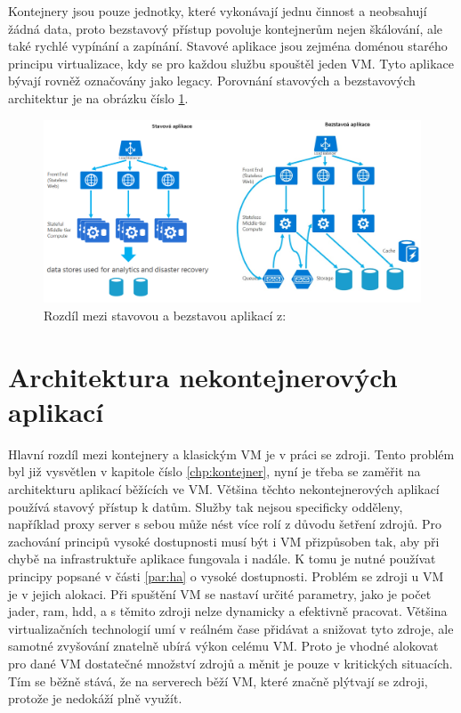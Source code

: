 Kontejnery jsou pouze jednotky, které vykonávají jednu činnost a neobsahují žádná data, proto bezstavový přístup povoluje kontejnerům nejen škálování, ale také rychlé vypínání a zapínání. Stavové aplikace jsou zejména doménou starého principu virtualizace, kdy se pro každou službu spouštěl jeden VM. Tyto aplikace bývají rovněž označovány jako legacy. Porovnání stavových a bezstavových architektur je na obrázku číslo \ref{fig:arch_app_statefull}.

\begin{figure}[H]
\begin{centering}
\includegraphics[width=1\textwidth]{img/micro_statefull}
\par\end{centering}
\caption{Rozdíl mezi stavovou a bezstavou aplikací z: \cite{ms_ms} \label{fig:arch_app_statefull}}
\end{figure}

\section{Architektura nekontejnerových aplikací}
Hlavní rozdíl mezi kontejnery a klasickým VM je v práci se zdroji. Tento problém byl již vysvětlen v kapitole číslo \ref{chp:kontejner}, nyní je třeba se zaměřit na architekturu aplikací běžících ve VM. Většina těchto nekontejnerových aplikací používá stavový přístup k datům. Služby tak nejsou specificky odděleny, například proxy server s sebou může nést více rolí z důvodu šetření zdrojů. Pro zachování principů vysoké dostupnosti musí být i VM přizpůsoben tak, aby při chybě na infrastruktuře aplikace fungovala i nadále. K tomu je nutné používat principy popsané v části \ref{par:ha} o vysoké dostupnosti. Problém se zdroji u VM je v jejich alokaci. Při spuštění VM se nastaví určité parametry, jako je počet jader, ram, hdd, a s těmito zdroji nelze dynamicky a efektivně pracovat. Většina virtualizačních technologií umí v reálném čase přidávat a snižovat tyto zdroje, ale samotné zvyšování znatelně ubírá výkon celému VM. Proto je vhodné alokovat pro dané VM dostatečné množství zdrojů a měnit je pouze v kritických situacích. Tím se běžně stává, že na serverech běží VM, které značně plýtvají se zdroji, protože je nedokáží plně využít.

